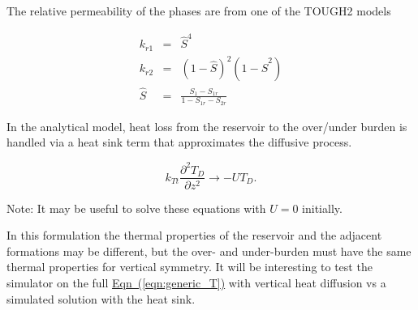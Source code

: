 \documentclass[12pt]{report}
\begin{document}
%
%

The relative permeability of the phases are from one of the TOUGH2 models


\begin{eqnarray}
k_{r1} &=& \hat{S}^4 \nonumber\\
k_{r2} &=& \left(1-\hat{S}\right)^2 \left(1-\hat{S}^2\right)\\
\hat{S} &=& \frac{S_1-S_{1r}}{1-S_{1r}-S_{2r}}\nonumber
\end{eqnarray}

In the analytical model, heat loss from the reservoir to the over/under burden is handled via a heat sink term that approximates the diffusive process.

\begin{equation}
k_{Tt}\frac{\partial^2 T_D}{\partial z^2} \to -U T_D.
\end{equation}

\noindent Note: It may be useful to solve these equations with $U=0$ initially.



%

In this formulation the thermal properties of the reservoir and the
adjacent formations may be different, but the over- and under-burden
must have the same thermal properties for vertical symmetry.  It will
be interesting to test the simulator on the full
\hyperref[eqn:generic_T]{Eqn~(\ref*{eqn:generic_T})} with vertical
heat diffusion vs a simulated solution with the heat sink.
\end{document}
